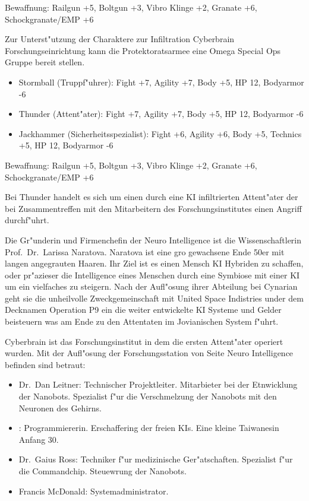 Bewaffnung: Railgun +5, Boltgun +3, Vibro Klinge +2, Granate +6, Schockgranate/EMP +6 


Zur Unterst"utzung der Charaktere zur Infiltration  Cyberbrain Forschungseinrichtung kann die Protektoratsarmee eine 
Omega Special Ops Gruppe bereit stellen.

\begin{itemize}
    \item Stormball (Truppf"uhrer): Fight +7, Agility +7, Body +5, HP 12, Bodyarmor -6
    \item Thunder (Attent"ater): Fight +7, Agility +7, Body +5, HP 12, Bodyarmor -6
    \item Jackhammer (Sicherheitsspezialist): Fight +6, Agility +6, Body +5, Technics +5, HP 12, Bodyarmor -6
\end{itemize}

Bewaffnung: Railgun +5, Boltgun +3, Vibro Klinge +2, Granate +6, Schockgranate/EMP +6 

Bei Thunder handelt es sich um einen durch eine KI infiltrierten Attent"ater der bei Zusammentreffen mit den 
Mitarbeitern des Forschungsinstitutes einen Angriff durchf"uhrt.

\renewcommand{\ml}{\pinyin{Mailin2}}


Die Gr"underin und Firmenchefin der Neuro Intelligence ist die Wissenschaftlerin Prof.~Dr.~Larissa Naratova. Naratova ist eine gro\3 gewachsene Ende 50er mit langen angegrauten Haaren. Ihr Ziel ist es einen Mensch KI Hybriden zu schaffen, oder pr"azieser die Intelligence eines Menschen durch eine Symbiose mit einer KI um ein vielfaches zu steigern. Nach der Aufl"osung ihrer Abteilung bei Cynarian geht sie die unheilvolle Zweckgemeinschaft mit United Space Indistries under dem Decknamen Operation P9 ein die weiter entwickelte KI Systeme und Gelder beisteuern was am Ende zu den Attentaten im Jovianischen System f"uhrt.


Cyberbrain ist das Forschungsinstitut in dem die ersten Attent"ater operiert wurden. Mit der Aufl"osung der Forschungsstation von Seite Neuro Intelligence befinden sind betraut:

\begin{itemize}
    \item Dr.~Dan Leitner: Technischer Projektleiter. Mitarbieter bei der Etnwicklung der Nanobots. Spezialist f"ur die Verschmelzung 
        der  Nanobots mit den Neuronen des Gehirns.
    \item \ml{}: Programmiererin. Erschaffering der freien KIs. Eine kleine Taiwanesin Anfang 30. 
    \item Dr.~Gaius Ross: Techniker f"ur medizinische Ger"atschaften. Spezialist f"ur die Commandchip. Steuewrung der Nanobots.
    \item Francis McDonald: Systemadministrator.
\end{itemize}


